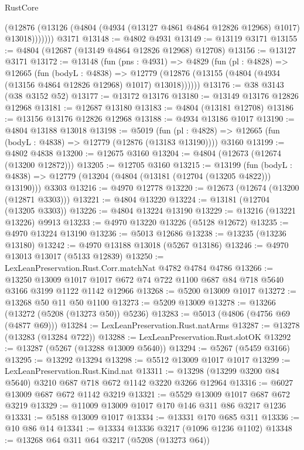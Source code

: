 \begin{lexlean}{RustCore}
\begin{coremodule}
            (@12876 (@13126 (@4804 (@4934 (@13127 @4861 @4864 @12826 @12968) @1017) @13018)))))))
    @3171
@13148 := @4802 @4931
@13149 := @13119 @3171
@13155 := @4804 (@12687 (@13149 @4864 @12826 @12968) @12708)
@13156 := @13127 @3171
@13172 := @13148
    (fun (pns : @4931) =>
    @4829
      (fun (pl : @4828) =>
      @12665
        (fun (bodyL : @4838) =>
        @12779 (@12876 (@13155 (@4804 (@4934 (@13156 @4864 @12826 @12968) @1017) @13018))))))
@13176 := @38 @3143 (@38 @3152 @52)
@13177 := @13172 @13176
@13180 := @13149 @13176 @12826 @12968
@13181 := @12687 @13180
@13183 := @4804 (@13181 @12708)
@13186 := @13156 @13176 @12826 @12968
@13188 := @4934 @13186 @1017
@13190 := @4804 @13188 @13018
@13198 := @5019
    (fun (pl : @4828) => @12665 (fun (bodyL : @4838) => @12779 (@12876 (@13183 @13190))))
    @3160
@13199 := @4802 @4838
@13200 := @12675 @3160
@13204 := @4804 (@12673 (@12674 (@13200 @12872)))
@13205 := @12705 @3160
@13215 := @13199
    (fun (bodyL : @4838) => @12779 (@13204 (@4804 (@13181 (@12704 (@13205 @4822))) @13190)))
    @3303
@13216 := @4970 @12778
@13220 := @12673 (@12674 (@13200 (@12871 @3303)))
@13221 := @4804 @13220
@13224 := @13181 (@12704 (@13205 @3303))
@13226 := @4804 @13224 @13190
@13229 := @13216 (@13221 @13226) @9913
@13233 := @4970 @13220 @13226 (@5128 @12672)
@13235 := @4970 @13224 @13190
@13236 := @5013 @12686
@13238 := @13235 (@13236 @13180)
@13242 := @4970 @13188 @13018 (@5267 @13186)
@13246 := @4970 @13013 @13017 (@5133 @12839)
@13250 := LexLeanPreservation.Rust.Corr.matchNat @4782 @4784 @4786
@13266 := @13250
    @13009
    @1017
    @1017
    @672
    @74
    @722
    @1100
    @687
    @84
    @718
    @5640
    @3166
    @3199
    @1122
    @1142
    @12966
@13268 := @5200 @13009 @1017
@13272 := @13268 @50 @11 @50 @1100
@13273 := @5209 @13009
@13278 := @13266 (@13272 (@5208 (@13273 @50)) @5236)
@13283 := @5013 (@4806 (@4756 @69 (@4877 @69)))
@13284 := LexLeanPreservation.Rust.natArms
@13287 := @13278 (@13283 (@13284 @722))
@13288 := LexLeanPreservation.Rust.slotOK
@13292 := @13287 (@5267 (@13288 @13009 @5640))
@13294 := @5267 (@5459 @3166)
@13295 := @13292 @13294
@13298 := @5512 @13009 @1017 @1017
@13299 := LexLeanPreservation.Rust.Kind.nat
@13311 := @13298 (@13299 @3200 @84 @5640) @3210 @687 @718 @672 @1142 @3220 @3266 @12964
@13316 := @6027 @13009 @687 @672 @1142 @3219
@13321 := @5529 @13009 @1017 @687 @672 @3219
@13329 := @11009 @13009 @1017 @170 @146 @311 @86 @3217 @1236
@13331 := @5188 @13009 @1017
@13334 := @13331 @170 @685 @311
@13336 := @10 @86 @14
@13341 := @13334 @13336 @3217 (@1096 @1236 @1102)
@13348 := @13268 @64 @311 @64 @3217 (@5208 (@13273 @64))

\end{coremodule}
\end{lexlean}
